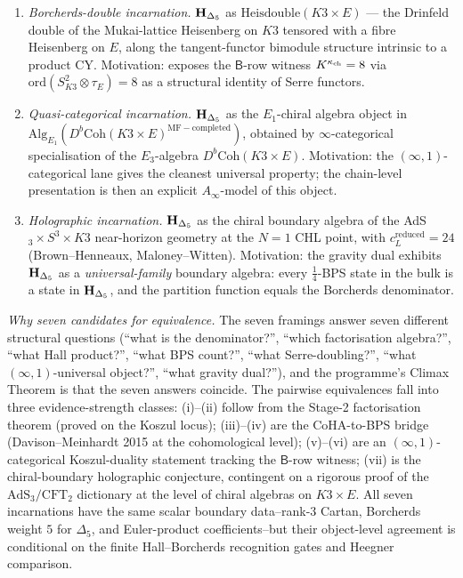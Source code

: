 \begin{theorem}
\begin{enumerate}[label=(\roman*)]
\item \emph{Borcherds-double incarnation.} $\mathbf{H}_{\Delta_5}$ as
$\mathrm{Heisdouble}(K3 \times E)$ --- the Drinfeld double of the
Mukai-lattice Heisenberg on $K3$ tensored with a fibre Heisenberg
on $E$, along the tangent-functor bimodule structure intrinsic to
a product CY. Motivation: exposes the $\mathsf{B}$-row witness
$K^{\kappa_{\mathrm{ch}}} = 8$ via $\mathrm{ord}(S_{K3}^2 \otimes \tau_E) = 8$ as a
structural identity of Serre functors.

\item \emph{Quasi-categorical incarnation.} $\mathbf{H}_{\Delta_5}$ as the
$E_1$-chiral algebra object in
$\mathrm{Alg}_{E_1}(D^b\mathrm{Coh}(K3 \times E)
^{\mathrm{MF-completed}})$, obtained by $\infty$-categorical
specialisation of the $E_3$-algebra $D^b\mathrm{Coh}(K3 \times E)$.
Motivation: the $(\infty, 1)$-categorical lane gives the cleanest
universal property; the chain-level presentation is then an
explicit $A_\infty$-model of this object.

\item \emph{Holographic incarnation.} $\mathbf{H}_{\Delta_5}$ as the chiral
boundary algebra of the AdS$_3 \times S^3 \times K3$ near-horizon
geometry at the $N = 1$ CHL point, with $c_L^{\mathrm{reduced}} = 24$
(Brown--Henneaux, Maloney--Witten). Motivation: the gravity dual
exhibits $\mathbf{H}_{\Delta_5}$ as a \emph{universal-family} boundary
algebra: every $\frac{1}{4}$-BPS state in the bulk is a state in
$\mathbf{H}_{\Delta_5}$, and the partition function equals the Borcherds
denominator.
\end{enumerate}

\emph{Why seven candidates for equivalence.} The seven framings answer
seven different structural questions (``what is the denominator?'',
``which factorisation algebra?'', ``what Hall product?'', ``what BPS
count?'', ``what Serre-doubling?'', ``what $(\infty, 1)$-universal
object?'', ``what gravity dual?''), and the programme's Climax
Theorem is that the seven answers coincide. The pairwise equivalences
fall into three evidence-strength classes: (i)--(ii) follow from the
Stage-2 factorisation theorem (proved on the Koszul locus);
(iii)--(iv) are the CoHA-to-BPS bridge (Davison--Meinhardt 2015 at
the cohomological level); (v)--(vi) are an $(\infty, 1)$-categorical
Koszul-duality statement tracking the $\mathsf{B}$-row witness; (vii)
is the chiral-boundary holographic conjecture, contingent on a
rigorous proof of the $\mathrm{AdS}_3 / \mathrm{CFT}_2$ dictionary at
the level of chiral algebras on $K3 \times E$. All seven
incarnations have the same scalar boundary data--rank-$3$ Cartan,
Borcherds weight $5$ for $\Delta_5$, and Euler-product coefficients--but
their object-level agreement is conditional on the finite
Hall--Borcherds recognition gates and Heegner comparison.
\end{theorem}

